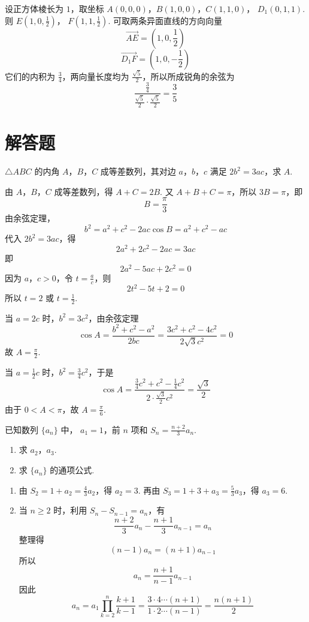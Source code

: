 \begin{solution}
设正方体棱长为 \(1\)，取坐标 \(A(0,0,0)\)，\(B(1,0,0)\)，\(C(1,1,0)\)，
\(D_1(0,1,1)\). 则 \(E\left(1,0,\frac12\right)\)，
\(F\left(1,1,\frac12\right)\).
可取两条异面直线的方向向量
\[
\overrightarrow{AE}=\left(1,0,\frac12\right)
\]
\[
\overrightarrow{D_1F}=\left(1,0,-\frac12\right)
\]
它们的内积为 \(\frac34\)，两向量长度均为 \(\frac{\sqrt5}{2}\)，所以所成锐角的余弦为
\[
\frac{\frac34}{\frac{\sqrt5}{2}\cdot\frac{\sqrt5}{2}}=\frac35
\]
\end{solution}

\section{解答题}

\begin{problem}
\(\triangle ABC\) 的内角 \(A\)，\(B\)，\(C\) 成等差数列，其对边 \(a\)，\(b\)，\(c\) 满足 \(2b^{2} = 3ac\)，求 \(A\).
\end{problem}

\begin{solution}
由 \(A\)，\(B\)，\(C\) 成等差数列，得 \(A+C=2B\). 又 \(A+B+C=\pi\)，所以 \(3B=\pi\)，即
\[
B=\frac{\pi}{3}
\]
由余弦定理，
\[
b^2=a^2+c^2-2ac\cos B=a^2+c^2-ac
\]
代入 \(2b^2=3ac\)，得
\[
2a^2+2c^2-2ac=3ac
\]
即
\[
2a^2-5ac+2c^2=0
\]
因为 \(a\)，\(c>0\)，令 \(t=\frac{a}{c}\)，则
\[
2t^2-5t+2=0
\]
所以 \(t=2\) 或 \(t=\frac12\).

当 \(a=2c\) 时，\(b^2=3c^2\)，由余弦定理
\[
\cos A=\frac{b^2+c^2-a^2}{2bc}
=\frac{3c^2+c^2-4c^2}{2\sqrt3c^2}=0
\]
故 \(A=\frac{\pi}{2}\).

当 \(a=\frac12c\) 时，\(b^2=\frac34c^2\)，于是
\[
\cos A=\frac{\frac34c^2+c^2-\frac14c^2}
{2\cdot\frac{\sqrt3}{2}c^2}
=\frac{\sqrt3}{2}
\]
由于 \(0<A<\pi\)，故 \(A=\frac{\pi}{6}\).
\end{solution}

\begin{problem}
已知数列 \( \{a_{n}\} \) 中， \( a_{1}=1 \)，前 \(n\) 项和 \( S_{n}=\frac{n+2}{3}a_{n} \).
\begin{enumerate}
\item 求 \(a_{2}\)，\(a_{3}\).
\item 求 \( \{a_{n}\} \) 的通项公式.
\end{enumerate}
\end{problem}

\begin{solution}
\begin{enumerate}
\item 由 \(S_2=1+a_2=\frac43a_2\)，得 \(a_2=3\). 再由 \(S_3=1+3+a_3=\frac53a_3\)，得 \(a_3=6\).
\item 当 \(n\geqslant2\) 时，利用 \(S_n-S_{n-1}=a_n\)，有
\[
\frac{n+2}{3}a_n-\frac{n+1}{3}a_{n-1}=a_n
\]
整理得
\[
(n-1)a_n=(n+1)a_{n-1}
\]
所以
\[
a_n=\frac{n+1}{n-1}a_{n-1}
\]
因此
\[
a_n=a_1\prod_{k=2}^{n}\frac{k+1}{k-1}
=\frac{3\cdot4\cdots(n+1)}{1\cdot2\cdots(n-1)}
=\frac{n(n+1)}{2}
\]
\end{enumerate}
\end{solution}


